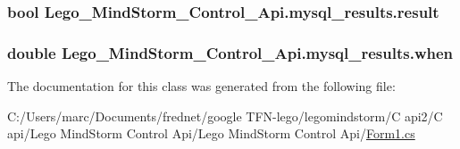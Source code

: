 \hypertarget{class_lego___mind_storm___control___api_1_1mysql__results_74bbf9491a54cddbca45e4ae9c94b899}{
\subsubsection[{result}]{\setlength{\rightskip}{0pt plus 5cm}bool {\bf Lego\_\-MindStorm\_\-Control\_\-Api.mysql\_\-results.result}}}
\label{class_lego___mind_storm___control___api_1_1mysql__results_74bbf9491a54cddbca45e4ae9c94b899}


\hypertarget{class_lego___mind_storm___control___api_1_1mysql__results_ac69cb8b3d47f0039bfd58b5aa46f41f}{
\subsubsection[{when}]{\setlength{\rightskip}{0pt plus 5cm}double {\bf Lego\_\-MindStorm\_\-Control\_\-Api.mysql\_\-results.when}}}
\label{class_lego___mind_storm___control___api_1_1mysql__results_ac69cb8b3d47f0039bfd58b5aa46f41f}




The documentation for this class was generated from the following file:\begin{CompactItemize}
\item 
C:/Users/marc/Documents/frednet/google TFN-lego/legomindstorm/C api2/C api/Lego MindStorm Control Api/Lego MindStorm Control Api/\hyperlink{_form1_8cs}{Form1.cs}\end{CompactItemize}
